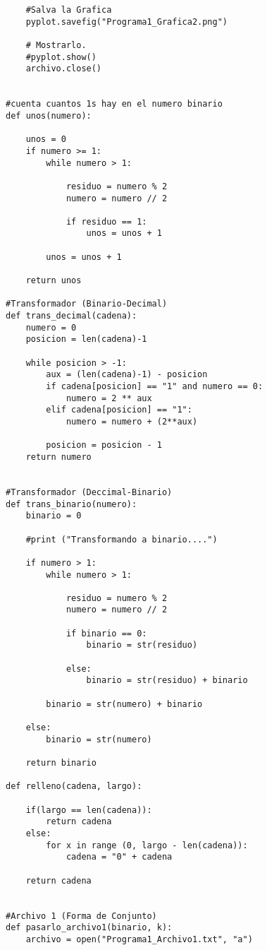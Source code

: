 \documentclass{article}
\begin{document}
\begin{flushleft}
\begin{lstlisting}
    #Salva la Grafica
    pyplot.savefig("Programa1_Grafica2.png")
    
    # Mostrarlo.
    #pyplot.show()
    archivo.close()
    

#cuenta cuantos 1s hay en el numero binario
def unos(numero):

    unos = 0
    if numero >= 1:
        while numero > 1:
                
            residuo = numero % 2
            numero = numero // 2
                
            if residuo == 1:
                unos = unos + 1
        
        unos = unos + 1
                            
    return unos

#Transformador (Binario-Decimal)
def trans_decimal(cadena):
    numero = 0
    posicion = len(cadena)-1

    while posicion > -1:
        aux = (len(cadena)-1) - posicion
        if cadena[posicion] == "1" and numero == 0:
            numero = 2 ** aux
        elif cadena[posicion] == "1":
            numero = numero + (2**aux)
            
        posicion = posicion - 1
    return numero


#Transformador (Deccimal-Binario)
def trans_binario(numero):
    binario = 0

    #print ("Transformando a binario....")

    if numero > 1:
        while numero > 1:
                
            residuo = numero % 2
            numero = numero // 2
                
            if binario == 0:
                binario = str(residuo)
                    
            else:
                binario = str(residuo) + binario
        
        binario = str(numero) + binario
                
    else:
        binario = str(numero)
        
    return binario

def relleno(cadena, largo):
    
    if(largo == len(cadena)):
        return cadena
    else:
        for x in range (0, largo - len(cadena)):
            cadena = "0" + cadena
            
    return cadena


#Archivo 1 (Forma de Conjunto)
def pasarlo_archivo1(binario, k):
    archivo = open("Programa1_Archivo1.txt", "a")
    

\end{lstlisting}
\end{flushleft}
\end{document}

